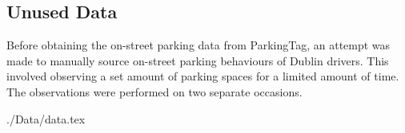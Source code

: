 \pagebreak

\subsection{Unused Data}
Before obtaining the on-street parking data from ParkingTag, an attempt was made to manually source on-street parking behaviours of Dublin drivers. This involved observing a set amount of parking spaces for a limited amount of time. The observations were performed on two separate occasions.

{./Data/data.tex}